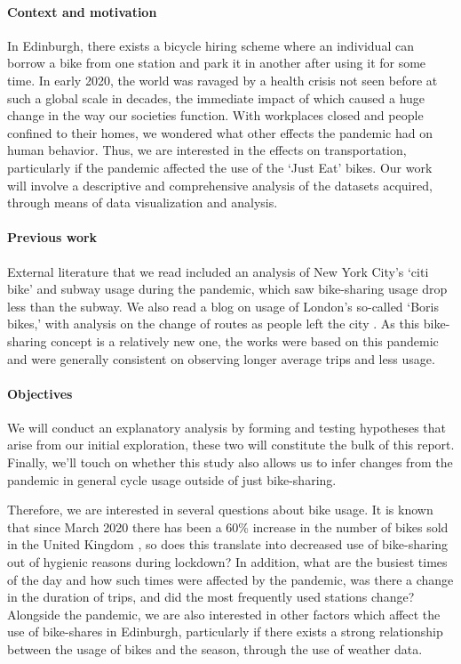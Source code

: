 \documentclass[11pt,a4paper]{article}
\begin{document}
\paragraph{Context and motivation}
In Edinburgh, there exists a bicycle hiring scheme where an individual can borrow a bike from one station and park it in another after using it for some time. In early 2020, the world was ravaged by a health crisis not seen before at such a global scale in decades, the immediate impact of which caused a huge change in the way our societies function. With workplaces closed and people confined to their homes, we wondered what other effects the pandemic had on human behavior. Thus, we are interested in the effects on transportation, particularly if the pandemic affected the use of the ‘Just Eat’ bikes. Our work will involve a descriptive and comprehensive analysis of the datasets acquired, through means of data visualization and analysis.

\paragraph{Previous work}
External literature that we read included an analysis of New York City’s ‘citi bike’ and subway usage during the pandemic, \cite{TEIXEIRA2020100166} which saw bike-sharing usage drop less than the subway. We also read a blog on usage of London’s so-called ‘Boris bikes,’ with analysis on the change of routes as people left the city \cite{Boris-Bikes}. As this bike-sharing concept is a relatively new one, the works were based on this pandemic and were generally consistent on observing longer average trips and less usage.

\paragraph{Objectives}
We will conduct an explanatory analysis by forming and testing hypotheses that arise from our initial exploration, these two will constitute the bulk of this report. Finally, we'll touch on whether this study also allows us to infer changes from the pandemic in general cycle usage outside of just bike-sharing.

Therefore, we are interested in several questions about bike usage. It is known that since March 2020 there has been a 60\% increase in the number of bikes sold in the United Kingdom \cite{Bike-Association}, so does this translate into decreased use of bike-sharing out of hygienic reasons during lockdown? In addition, what are the busiest times of the day and how such times were affected by the pandemic, was there a change in the duration of trips, and did the most frequently used stations change? Alongside the pandemic, we are also interested in other factors which affect the use of bike-shares in Edinburgh, particularly if there exists a strong relationship between the usage of bikes and the season, through the use of weather data. 
\end{document}
